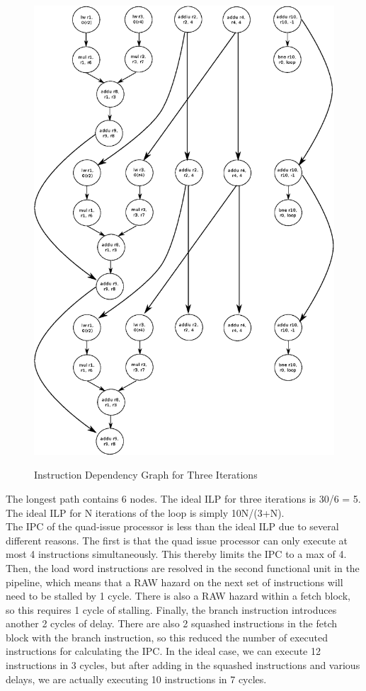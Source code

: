 \documentclass[10pt]{article}
\begin{document}
\begin{figure}[H]
\begin{center}
\includegraphics[scale=0.7]{threeiteri.eps}
\label{default}
\end{center}
\caption{Instruction Dependency Graph for Three Iterations}
\end{figure}
The longest path contains 6 nodes. 
The ideal ILP for three iterations is 30/6 = 5.\\

The ideal ILP for N iterations of the loop is simply 10N/(3+N).\\

The IPC of the quad-issue processor is less than the ideal ILP due to several different reasons. The first is that the quad issue processor can only execute at most 4 instructions simultaneously. This thereby limits the IPC to a max of 4. Then, the load word instructions are resolved in the second functional unit in the pipeline, which means that a RAW hazard on the next set of instructions will need to be stalled by 1 cycle. There is also a RAW hazard within a fetch block, so this requires 1 cycle of stalling. Finally, the branch instruction introduces another 2 cycles of delay. There are also 2 squashed instructions in the fetch block with the branch instruction, so this reduced the number of executed instructions for calculating the IPC. In the ideal case, we can execute 12 instructions in 3 cycles, but after adding in the squashed instructions and various delays, we are actually executing 10 instructions in 7 cycles. 
\end{document}
